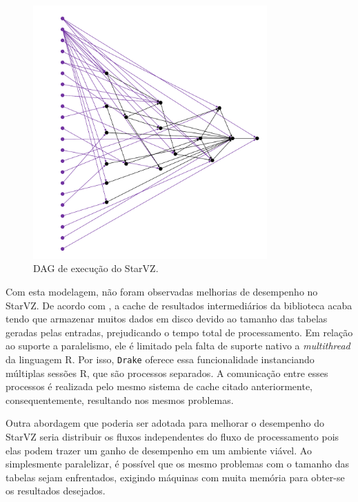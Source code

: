 \begin{figure}[ht]
\centerline{
\includegraphics[width=0.8\textwidth]{./img/drake-dag-final-origin.pdf}}
 \caption{DAG de execução do StarVZ.}
 \label{fig:starvz-dag}
\end{figure}

Com esta modelagem, não foram observadas melhorias de desempenho no StarVZ. De 
acordo com \citet{ref:drakestarvz}, a cache de resultados intermediários da 
biblioteca acaba tendo que armazenar muitos dados em disco devido ao tamanho 
das tabelas geradas pelas entradas, prejudicando o tempo total de processamento.
Em relação ao suporte a paralelismo, ele é limitado pela falta de suporte 
nativo a \textit{multithread} da linguagem R. Por isso, \texttt{Drake} oferece 
essa funcionalidade instanciando múltiplas sessões R, que são processos 
separados. A comunicação entre esses processos é realizada pelo mesmo sistema 
de cache citado anteriormente, consequentemente, resultando nos mesmos 
problemas.

Outra abordagem que poderia ser adotada para melhorar o desempenho do StarVZ 
seria distribuir os fluxos independentes do fluxo de processamento pois elas 
podem trazer um ganho de desempenho em um ambiente viável. Ao simplesmente 
paralelizar, é possível que os mesmo problemas com o tamanho das tabelas sejam 
enfrentados, exigindo máquinas com muita memória para obter-se os resultados 
desejados. 

